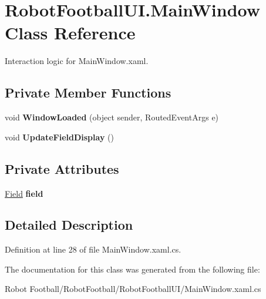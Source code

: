 \hypertarget{class_robot_football_u_i_1_1_main_window}{\section{Robot\-Football\-U\-I.\-Main\-Window Class Reference}
\label{class_robot_football_u_i_1_1_main_window}
}


Interaction logic for Main\-Window.\-xaml.  


\subsection*{Private Member Functions}
\begin{DoxyCompactItemize}
\item 
\hypertarget{class_robot_football_u_i_1_1_main_window_a9d7089b017ae89632e64d07003c69c63}{void {\bfseries Window\-Loaded} (object sender, Routed\-Event\-Args e)}\label{class_robot_football_u_i_1_1_main_window_a9d7089b017ae89632e64d07003c69c63}

\item 
\hypertarget{class_robot_football_u_i_1_1_main_window_a7b5576e4e0a4edf36386f1558cb9a859}{void {\bfseries Update\-Field\-Display} ()}\label{class_robot_football_u_i_1_1_main_window_a7b5576e4e0a4edf36386f1558cb9a859}

\end{DoxyCompactItemize}
\subsection*{Private Attributes}
\begin{DoxyCompactItemize}
\item 
\hypertarget{class_robot_football_u_i_1_1_main_window_a302b57b05d3117e365d6cf8fa3b20193}{\hyperlink{class_robot_football_core_1_1_objects_1_1_field}{Field} {\bfseries field}}\label{class_robot_football_u_i_1_1_main_window_a302b57b05d3117e365d6cf8fa3b20193}

\end{DoxyCompactItemize}


\subsection{Detailed Description}


Definition at line 28 of file Main\-Window.\-xaml.\-cs.



The documentation for this class was generated from the following file\-:\begin{DoxyCompactItemize}
\item 
Robot Football/\-Robot\-Football/\-Robot\-Football\-U\-I/Main\-Window.\-xaml.\-cs\end{DoxyCompactItemize}
